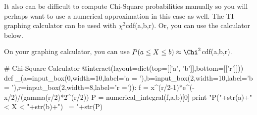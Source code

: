 \documentclass[10pt,]{book}
\numberwithin{equation}{section}
\begin{document}
%
\par
\hypertarget{p-1252}{}%
It also can be difficult to compute Chi-Square probabilities manually so you will perhaps want to use a numerical approximation in this case as well. The TI graphing calculator can be used with \(\chi ^2\)cdf(a,b,r).  Or, you can use the calculator below.%
\par
\hypertarget{p-1253}{}%
On your graphing calculator, you can use \(P(a \le X \le b) \approx \Chi^2\)cdf(a,b,r).%
\par
\hypertarget{p-1254}{}%
\leavevmode%
\begin{sageinput}
# Chi-Square Calculator
@interact(layout=dict(top=[['a', 'b']],bottom=[['r']]))
def _(a=input_box(0,width=10,label='a = '),b=input_box(2,width=10,label='b = '),r=input_box(2,width=8,label='r =')):
    f = x^(r/2-1)*e^(-x/2)/(gamma(r/2)*2^(r/2))
    P = numerical_integral(f,a,b)[0]
    print "P("+str(a)+" < X < "+str(b)+") ~= "+str(P)
\end{sageinput}
%
%
%
\typeout{************************************************}
\typeout{************************************************}
%
\end{document}
